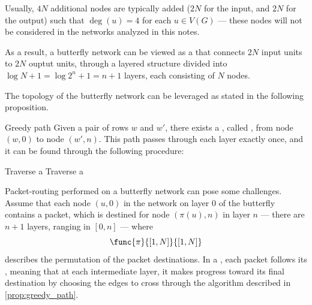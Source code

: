 \documentclass[a4paper, 12pt]{report}
\begin{document}

    Usually, $4N$ additional nodes are typically added ($2N$ for the input, and $2N$ for the output) such that $\deg(u) = 4$ for each $u \in V(G)$ --- these nodes will not be considered in the networks analyzed in this notes.


    As a result, a butterfly network can be viewed as a  that connects $2N$ input units to $2N$ ouptut units, through a layered structure divided into $\log N +1 = \log 2^n +1 = n + 1$ layers, each consisting of $N$ nodes.

    The topology of the butterfly network can be leveraged as stated in the following proposition.

    \begin{framedprop}[label={prop:greedy_path}]{Greedy path}
        Given a pair of rows $w$ and $w'$, there exists a , called , from node $(w, 0)$ to node $(w', n)$. This path passes through each layer exactly once, and it can be found through the following procedure:

        \begin{algorithmic}[1]
                        \State Traverse a 
                    \Else
                        \State Traverse a 
                    \EndIf
                \EndFor
            \EndFunction
        \end{algorithmic}
    \end{framedprop}

    Packet-routing performed on a butterfly network can pose some challenges. Assume that each node $(u, 0)$ in the network on layer 0 of the butterfly contains a packet, which is destined for node $(\pi(u), n)$ in layer $n$ --- there are $n + 1$ layers, ranging in $[0, n]$ --- where $$\func{\pi}{[1, N]}{[1, N]}$$ describes the permutation of the packet destinations. In a , each packet follows its , meaning that at each intermediate layer, it makes progress toward its final destination by choosing the edges to cross through the algorithm described in \cref{prop:greedy_path}.
\end{document}

